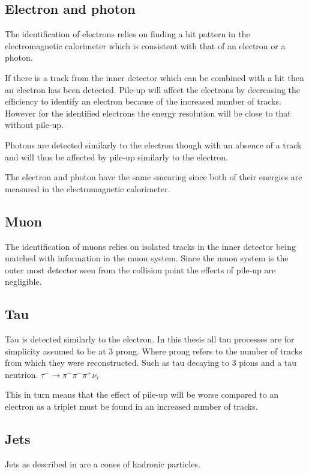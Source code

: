 \subsection{Electron and photon}
The identification of electrons relies on finding a hit pattern in the electromagnetic calorimeter which is consistent with that of an electron or a photon. 

If there is a track from the inner detector which can be combined with a hit then an electron has been detected. Pile-up will affect the electrons by decreasing the efficiency to identify an electron because of the increased number of tracks. However for the identified electrons the energy resolution will be close to that without pile-up. 

Photons are detected similarly to the electron though with an absence of a track and will thus be affected by pile-up similarly to the electron.

The electron and photon have the same smearing since both of their energies are measured in the electromagnetic calorimeter. 

\subsection{Muon}
The identification of muons relies on isolated tracks in the inner detector  being matched with information in the muon system. Since the muon system is the outer most detector seen from the collision point the effects of pile-up are negligible.  
\subsection{Tau}\label{sec:smear:subsec:tau}
Tau is detected similarly to the electron.
In this thesis all tau processes are for simplicity assumed to be at 3 prong. Where prong refers to the number of tracks from which they were reconstructed. Such as tau decaying to 3 pions and a tau neutrion. $\tau ^{-} \rightarrow \pi ^{-} \pi ^{-} \pi ^{+} \nu _{\tau}$

This in turn means that the effect of pile-up will be worse compared to an electron as a triplet must be found in an increased number of tracks.
\subsection{Jets}\label{sec:smear:subsec:jets}
Jets as described in  are a cones of hadronic particles. 

